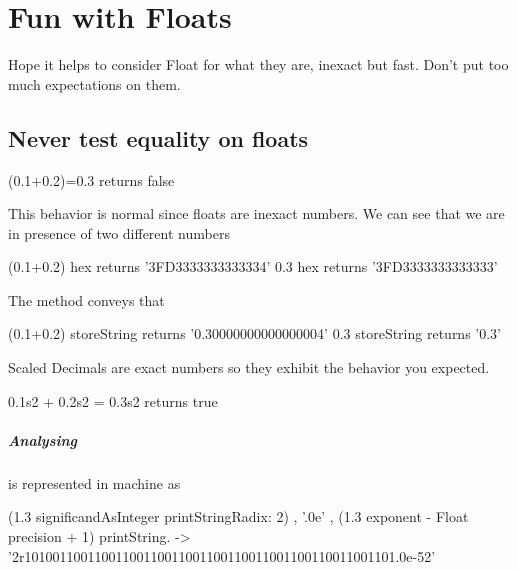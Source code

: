 \documentclass[a4paper,10pt,twoside]{book}
\begin{document}
\fi
\sloppy

\chapter{Fun with Floats}

Hope it helps to consider Float for what they are, inexact but fast.
Don't put too much expectations on them.



\section{Never test equality on floats}

\begin{code}{}
(0.1+0.2)=0.3
	returns false
\end{code}

This behavior is normal since floats are inexact numbers.
We can see that we are in presence of two different numbers

\begin{code}{}
(0.1+0.2) hex 
	returns '3FD3333333333334'
0.3 hex 
	returns '3FD3333333333333' 
\end{code}

	
The method  conveys that 
		
\begin{code}{}
(0.1+0.2) storeString 
	returns 	'0.30000000000000004' 
0.3 storeString 
	returns	'0.3'
\end{code}	
		
		
Scaled Decimals are exact numbers so they exhibit the behavior you expected.

\begin{code}{}
0.1s2 + 0.2s2 = 0.3s2
	returns true
\end{code}		
		

\paragraph{Analysing }
 is represented in machine as

\begin{code}{}
(1.3 significandAsInteger printStringRadix: 2) , '.0e' , (1.3 exponent
- Float precision + 1) printString.
-> '2r10100110011001100110011001100110011001100110011001101.0e-52'
\end{code}
\end{document}
